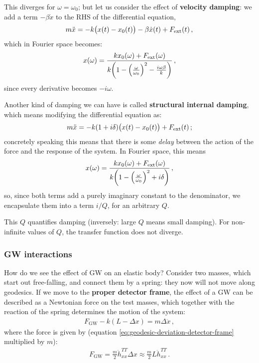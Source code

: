 \documentclass[main.tex]{subfiles}
\begin{document}
This diverges for \(\omega = \omega_0 \); but let us consider the effect of \textbf{velocity damping}: we add a term \(- \beta \dot{x}\) to the RHS of the differential equation,
%
\begin{align}
m \ddot{x} = - k \qty(x(t) - x_0 (t)) - \beta \dot{x}(t) + F _{\text{ext}}(t)
\,,
\end{align}
%
which in Fourier space becomes:
%
\begin{align}
x(\omega ) = \frac{k x_0 (\omega ) + F _{\text{ext}}(\omega )}{k \qty(1 - \qty( \frac{\omega}{\omega_0 })^2 - \frac{i \omega \beta }{k})}
\,,
\end{align}
%
since every derivative becomes \(- i \omega \). 

Another kind of damping we can have is called \textbf{structural internal damping}, which means modifying the differential equation as:
%
\begin{align}
m \ddot{x} = - k (1 + i \delta ) \qty(x(t) - x_0 (t)) + F _{\text{ext}}(t)
\,;
\end{align}
%
concretely speaking this means that there is some \emph{delay} between the action of the force and the response of the system. In Fourier space, this means 
%
\begin{align}
x(\omega ) = \frac{k x_0 (\omega ) + F _{\text{ext}}(\omega )}{k \qty(1 - \qty( \frac{\omega}{\omega_0 })^2 + i \delta )}
\,,
\end{align}
%
so, since both terms add a purely imaginary constant to the denominator, we encapsulate them into a term \(i / Q\), for an arbitrary \(Q\). 

This \(Q\) quantifies damping (inversely: large \(Q\) means small damping). For non-infinite values of \(Q\), the transfer function does not diverge.

\subsubsection{GW interactions}

How do we see the effect of GW on an elastic body?
Consider two masses, which start out free-falling, and connect them by a spring: they now will not move along geodesics.
If we move to the \textbf{proper detector frame}, the effect of a GW can be described as a Newtonian force on the test masses, which together with the reaction of the spring determines the motion of the system:
%
\begin{align}
F _{\text{GW}} - k (L - \Delta x) = m \Delta \ddot{x}
\,,
\end{align}
%
where the force is given by (equation \eqref{eq:geodesic-deviation-detector-frame} multiplied by \(m\)):
%
\begin{align}
F_{\text{GW}} = \frac{m}{2} \ddot{h}^{TT}_{xx} \Delta x \approx \frac{m}{2} L \ddot{h}^{TT}_{xx}
\,.
\end{align}
\end{document}
